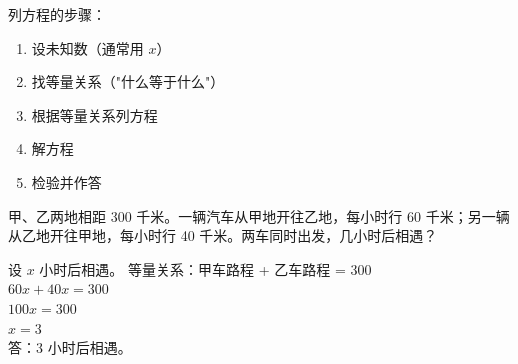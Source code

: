 列方程的步骤：
\begin{enumerate}
  \item 设未知数（通常用 $x$）
  \item 找等量关系（"什么等于什么"）
  \item 根据等量关系列方程
  \item 解方程
  \item 检验并作答
\end{enumerate}

\begin{example}
甲、乙两地相距 300 千米。一辆汽车从甲地开往乙地，每小时行 60 千米；另一辆从乙地开往甲地，每小时行 40 千米。两车同时出发，几小时后相遇？
\end{example}
\begin{solution}
设 $x$ 小时后相遇。
等量关系：甲车路程 + 乙车路程 = 300\\
$60x + 40x = 300$\\
$100x = 300$\\
$x = 3$\\
答：3 小时后相遇。
\end{solution}

